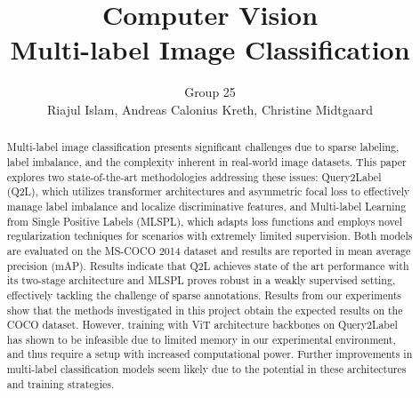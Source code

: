 \documentclass[lettersize,journal]{IEEEtran}
\begin{document}
\title{Computer Vision\\ \vspace{.5em} 
\Large Multi-label Image Classification}
\author{Group 25 \\ \vspace{.2em} Riajul Islam, Andreas Calonius Kreth, Christine Midtgaard}



\maketitle







\begin{abstract}
Multi-label image classification presents significant challenges due to sparse labeling, label imbalance, and the complexity inherent in real-world image datasets. This paper explores two state-of-the-art methodologies addressing these issues: Query2Label (Q2L), which utilizes transformer architectures and asymmetric focal loss to effectively manage label imbalance and localize discriminative features, and Multi-label Learning from Single Positive Labels (MLSPL), which adapts loss functions and employs novel regularization techniques for scenarios with extremely limited supervision. Both models are evaluated on the MS-COCO 2014 dataset and results are reported in mean average precision (mAP). Results indicate that Q2L achieves state of the art performance with its two-stage architecture and MLSPL proves robust in a weakly supervised setting, effectively tackling the challenge of sparse annotations. Results from our experiments show that the methods investigated in this project obtain the expected results on the COCO dataset. However, training with ViT architecture backbones on Query2Label has shown to be infeasible due to limited memory in our experimental environment, and thus require a setup with increased computational power. Further improvements in multi-label classification models seem likely due to the potential in these architectures and training strategies.
\end{abstract}
\end{document}
